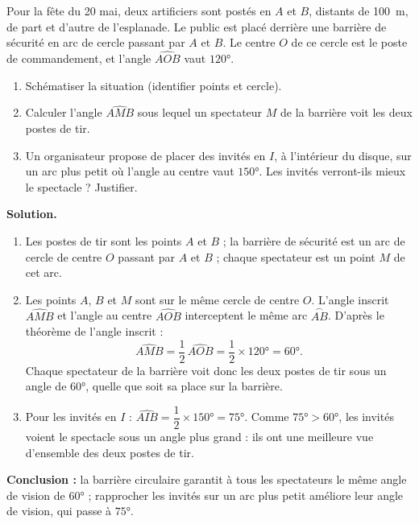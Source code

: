 \documentclass[11pt]{article}
\begin{document}
\begin{exoresolu}
Pour la fête du 20 mai, deux artificiers sont postés en $A$ et $B$, distants de \SI{100}{\meter}, de part et d'autre de l'esplanade. Le public est placé derrière une barrière de sécurité en arc de cercle passant par $A$ et $B$. Le centre $O$ de ce cercle est le poste de commandement, et l'angle $\widehat{AOB}$ vaut $120°$.
\begin{enumerate}
\item Schématiser la situation (identifier points et cercle).
\item Calculer l'angle $\widehat{AMB}$ sous lequel un spectateur $M$ de la barrière voit les deux postes de tir.
\item Un organisateur propose de placer des invités en $I$, à l'intérieur du disque, sur un arc plus petit où l'angle au centre vaut $150°$. Les invités verront-ils mieux le spectacle ? Justifier.
\end{enumerate}
\tcblower
\textbf{Solution.}
\begin{enumerate}
\item Les postes de tir sont les points $A$ et $B$ ; la barrière de sécurité est un arc de cercle de centre $O$ passant par $A$ et $B$ ; chaque spectateur est un point $M$ de cet arc.
\item Les points $A$, $B$ et $M$ sont sur le même cercle de centre $O$. L'angle inscrit $\widehat{AMB}$ et l'angle au centre $\widehat{AOB}$ interceptent le même arc $\overset{\frown}{AB}$. D'après le théorème de l'angle inscrit :
\[ \widehat{AMB} = \frac{1}{2}\,\widehat{AOB} = \frac{1}{2}\times 120° = 60°. \]
Chaque spectateur de la barrière voit donc les deux postes de tir sous un angle de $60°$, quelle que soit sa place sur la barrière.
\item Pour les invités en $I$ : $\widehat{AIB} = \dfrac{1}{2}\times 150° = 75°$. Comme $75° > 60°$, les invités voient le spectacle sous un angle plus grand : ils ont une meilleure vue d'ensemble des deux postes de tir.
\end{enumerate}
\textbf{Conclusion :} la barrière circulaire garantit à tous les spectateurs le même angle de vision de $60°$ ; rapprocher les invités sur un arc plus petit améliore leur angle de vision, qui passe à $75°$.
\end{exoresolu}
\end{document}
